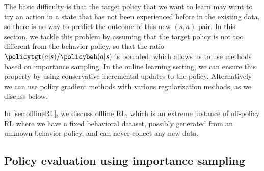 The basic difficulty  is that the target policy  that we want to learn
may want to try an action in a state that has
not been experienced before in the existing data,
so there is no way to predict the outcome of this new $(s,a)$
pair.
In this section, we tackle this problem by assuming
that the  target policy is not too different from the behavior policy,
so that the ratio $\policytgt(a|s)/\policybeh(a|s)$
is bounded, which allows us to use methods based on importance
sampling.
In the online learning setting, we can ensure this property
by using conservative incremental updates to the policy.
Alternatively we can use policy gradient methods
with various regularization methods, as we discuss below.

In \cref{sec:offlineRL}, we discuss offline RL,
which is an extreme instance of off-policy RL where we
have a fixed behavioral dataset, possibly generated from an unknown
behavior policy,
and can never collect any new data.



\subsection{Policy evaluation using importance sampling}
\label{sec:offpolicyRL-IS}

